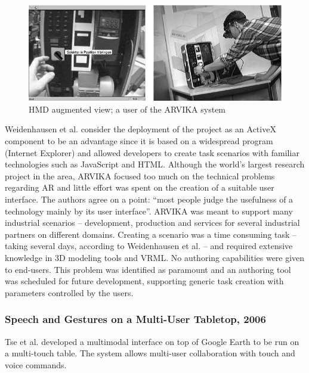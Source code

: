 \begin{figure}[htb]
		\centering
    \includegraphics[width=0.8\columnwidth]{gfx/arvika.png}
    \caption{HMD augmented view; a user of the ARVIKA system}
    \label{FIG-ARVIKA}
\end{figure}



Weidenhausen et al. \cite{ARVIKA-LESSONS} consider the deployment of the project as an ActiveX component
to be an advantage since it is based on a widespread program (Internet Explorer) and allowed developers
to create task scenarios with familiar technologies such as JavaScript and HTML.
Although the world's largest research project in the area, ARVIKA focused too much on the technical problems
regarding AR and little effort was spent on the creation of a suitable user interface.
The authors agree on a point: ``most people judge the usefulness of a technology mainly by its user interface''.
ARVIKA was meant to support many industrial scenarios -- development, production and services for several
industrial partners on different domains.
Creating a scenario was a time consuming task -- taking several days, according to Weidenhausen et al.
-- and required extensive knowledge in 3D modeling tools and VRML. No authoring capabilities were given to end-users.
This problem was identified as paramount and an authoring tool was scheduled for future development,
supporting generic task creation with parameters controlled by the users.




\subsubsection{Speech and Gestures on a Multi-User Tabletop, 2006}

Tse et al. \cite{SP-GEST-TTOP} developed a multimodal interface on top of Google Earth \cite{SITE-EARTH}
to be run on a multi-touch table.
The system allows multi-user collaboration with touch and voice commands.

